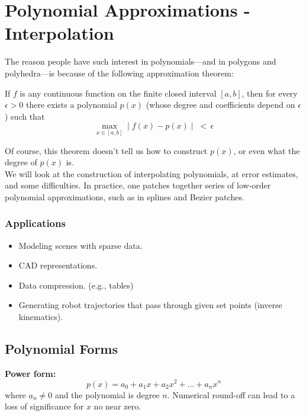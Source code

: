 \chapter{Polynomial Approximations - Interpolation}

The reason people have such interest in polynomials---and in polygons and polyhedra---is because of the following approximation theorem:

\begin{theorem}
If $f$ is any continuous function on the finite closed interval $[a,b]$, then for every $\epsilon>0$ there exists a polynomial $p(x)$ (whose degree and coefficients depend on $\epsilon$) such that 
$$
\max_{x\in [a,b]} \mid f(x) - p(x) \mid \; < \, \epsilon
$$
\end{theorem}

Of course, this theorem doesn't tell us how to construct $p(x)$, or even what the degree of $p(x)$ is. \\

We will look at the construction of interpolating polynomials, at error estimates, and some difficulties.
In practice, one patches together series of low-order polynomial approximations, such as in splines and Bezier patches.

\subsection*{Applications}
\begin{itemize}
    \item Modeling scenes with sparse data.
    \item CAD representations.
    \item Data compression. (e.g., tables)
    \item Generating robot trajectories that pass through given set points (inverse kinematics). 
\end{itemize}

\section{Polynomial Forms}

\textbf{Power form:}
$$
p(x) = a_0 + a_1 x + a_2 x^2 + \dots + a_n x^n
$$
where $a_n \neq 0$ and the polynomial is degree $n$. Numerical round-off can lead to a loss of significance for $x$ no near zero. \\

